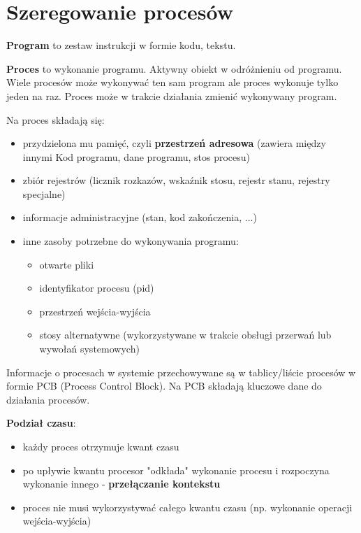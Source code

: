 \section{Szeregowanie procesów}

\textbf{Program} to zestaw instrukcji w formie kodu, tekstu.

\textbf{Proces} to wykonanie programu. Aktywny obiekt w odróżnieniu od programu. Wiele procesów może wykonywać ten sam program ale proces wykonuje tylko jeden na raz. Proces może w trakcie działania zmienić wykonywany program. 

Na proces składają się: 

\begin{itemize}
    \item przydzielona mu pamięć, czyli \textbf{przestrzeń adresowa} (zawiera między innymi Kod programu, dane programu, stos procesu)
    \item zbiór rejestrów (licznik rozkazów, wskaźnik stosu, rejestr stanu, rejestry specjalne)
    \item informacje administracyjne (stan, kod zakończenia, ...)
    \item inne zasoby potrzebne do wykonywania programu:
        \begin{itemize}
            \item otwarte pliki
            \item identyfikator procesu (pid)
            \item przestrzeń wejścia-wyjścia
            \item stosy alternatywne (wykorzystywane w trakcie obsługi przerwań lub wywołań systemowych)
        \end{itemize}
\end{itemize}

Informacje o procesach w systemie przechowywane są w tablicy/liście procesów w formie PCB (Process Control Block). Na PCB składają kluczowe dane do działania procesów.

\textbf{Podział czasu}:
\begin{itemize}
    \item każdy proces otrzymuje kwant czasu
    \item po upływie kwantu procesor "odkłada" wykonanie procesu i rozpoczyna wykonanie innego - \textbf{przełączanie kontekstu}
    \item proces nie musi wykorzystywać całego kwantu czasu (np. wykonanie operacji wejścia-wyjścia)
\end{itemize}    


